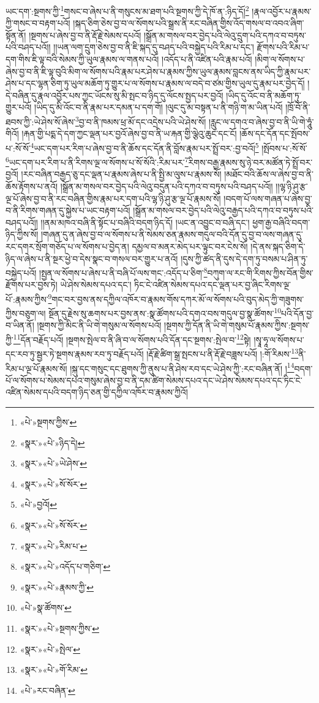 ཡང་དག་:སྔགས་ཀྱི་\footnote{«པེ་»སྔགས་ཀྱིས་}གསང་བ་ཞེས་པ་ནི་གསུངས་མ་ཐག་པའི་སྔགས་ཀྱི་དེ་ཁོ་ན་:ཉིད་དོ།\footnote{«སྣར་»«པེ་»ཉིད་དེ།} །རྣལ་འབྱོར་པ་རྣམས་ཀྱི་གསང་བ་བརྟག་པའོ། །སྐད་ཅིག་ཅེས་བྱ་བ་ལ་སོགས་པའི་སྒྲས་ནི་རང་བཞིན་གྱིས་འོད་གསལ་བ་འབའ་ཞིག་སྟོན་ནོ། །སྔགས་པ་ཞེས་བྱ་བ་ནི་རྡོ་རྗེ་སེམས་དཔའོ། །སྒྲོན་མ་གསལ་བར་བྱེད་པའི་ལེའུ་དྲུག་པའི་དཀའ་བ་བཏུས་པའི་བཤད་པའོ།། །།ཡན་ལག་དྲུག་ཅེས་བྱ་བ་ནི་ཇི་སྐད་དུ་བཤད་པའི་བསྐྱེད་པའི་རིམ་པ་དང་། རྫོགས་པའི་རིམ་པ་དག་གིས་ཇི་ལྟ་བའི་སེམས་ཀྱི་ཡུལ་རྣམས་ལ་གནས་པའོ། །འདོད་པ་ནི་འཛིན་པའི་རྣམ་པའོ། །མིག་ལ་སོགས་པ་ཞེས་བྱ་བ་ནི་ཇི་ལྟ་བུའི་མིག་ལ་སོགས་པའི་རྣམ་པར་ཤེས་པ་རྣམས་ཀྱིས་ཡུལ་རྣམས་བླངས་ནས་ཡིད་ཀྱི་རྣམ་པར་ཤེས་པ་དང་ལྷན་ཅིག་ཏུ་ཡུལ་མཆོག་ཏུ་གྱུར་པ་ལ་སོགས་པ་རྣམས་ལ་བདེ་བ་ཙམ་གྱིས་ཡུལ་དུ་རྣམ་པར་བྱེད་དོ། །དེ་བཞིན་དུ་རྣལ་འབྱོར་པས་ཀྱང་ཡོངས་སུ་མི་སྤང་བ་ཉིད་དུ་ལོངས་སྤྱད་པར་བྱའོ། །ཡིད་དུ་འོང་བ་ནི་མཆོག་ཏུ་གྱུར་པའོ། །ཡིད་དུ་མི་འོང་བ་ནི་རྣམ་པར་དམན་པ་དག་གོ། །ལུང་དུ་མ་བསྟན་པ་ནི་གཉི་ག་མ་ཡིན་པའོ། །ཁྲོ་བོ་ནི་ཐབས་ཀྱི་:ཡེ་ཤེས་སོ་ཞེས་\footnote{«སྣར་»«པེ་»ཡེ་ཤེས་}བྱ་བ་ནི་ཁམས་ཕྲ་མོ་དང་འདྲེས་པའི་ཡེ་ཤེས་སོ། །རླུང་ལ་དགའ་བ་ཞེས་བྱ་བ་ནི་ཡི་གེ་ཧཱུཾ་གིའོ། །རྐན་གྱི་པདྨ་དེ་དག་ཀྱང་ལྡན་པར་བྱའོ་ཞེས་བྱ་བ་ནི་ཡ་རྐན་གྱི་ལྕེའུ་ཆུང་དང་ངོ། །ཆོས་དང་དོན་དང་སྤོབས་པ་:སོ་སོ་\footnote{«སྣར་»«པེ་»སོ་སོར་}ཡང་དག་པར་རིག་པ་ཞེས་བྱ་བ་ནི་ཆོས་དང་དོན་ནི་བློས་རྣམ་པར་སྤྲོ་བར་:བྱ་བའོ།\footnote{«པེ་»བྱའོ།} །སྤོབས་པ་:སོ་སོ་\footnote{«སྣར་»«པེ་»སོ་སོར་}ཡང་དག་པར་རིག་པ་ནི་རིགས་ལྔ་ལ་སོགས་པ་སོ་སོའི་:རིམ་པར་\footnote{«སྣར་»«པེ་»རིམ་པ་}རིགས་བརྒྱ་རྣམས་སུ་ཉེ་བར་མཚོན་ཏེ་སྤྲོ་བར་བྱའོ། །རང་བཞིན་བརྒྱད་ཅུ་དང་ལྡན་པ་རྣམས་ཞེས་པ་ནི་སྤྱི་མ་ལུས་པ་རྣམས་སོ། །མཐོང་བའི་ཆོས་ལ་ཞེས་བྱ་བ་ནི་ཆོས་རྟོགས་པ་ནའོ། །སྒྲོན་མ་གསལ་བར་བྱེད་པའི་ལེའུ་བདུན་པའི་དཀའ་བ་བཏུས་པའི་བཤད་པའོ།། །།ལྷ་ཉི་ཤུ་རྩ་ལྔ་པོ་ཞེས་བྱ་བ་ནི་རང་བཞིན་གྱིས་རྣམ་པར་དག་པའི་ལྷ་ཉི་ཤུ་རྩ་ལྔ་པོ་རྣམས་སོ། །བདག་པོ་ལས་གཞན་པ་ཞེས་བྱ་བ་ནི་རིགས་གཞན་དུ་སྐྱེས་པ་ཡང་བརྟག་པའོ། །སྒྲོན་མ་གསལ་བར་བྱེད་པའི་ལེའུ་བརྒྱད་པའི་དཀའ་བ་བཏུས་པའི་བཤད་པའོ།། །།ནམ་མཁའ་བཞི་ནི་སྟོང་པ་བཞིའི་བདག་ཉིད་དོ། །ཡང་ན་འབྱུང་བ་བཞི་དང་། ཕྱག་རྒྱ་བཞིའི་བདག་ཉིད་ཀྱིས་སོ། །གཞན་དུ་ན་ཞེས་བྱ་བ་ལ་སོགས་པ་ནི་སེམས་ཅན་རྣམས་གདུལ་བའི་དོན་དུ་བྱ་བ་ལས་གཞན་དུ་རང་དགར་སྲོག་གཅོད་པ་ལ་སོགས་པ་བྱེད་ན། དམྱལ་བ་མནར་མེད་པར་ལྟུང་བར་ངེས་སོ། །དེ་ནས་སྐད་ཅིག་དེ་ཉིད་ལ་ཞེས་པ་ནི་སྔར་ཕྱེ་བ་དེས་སྣང་བ་གསལ་བར་གྱུར་པ་ནའོ། །དུས་ཀྱི་ཚད་ནི་དུས་དེ་དག་ཏུ་བསམ་པ་ཤིན་ཏུ་བསྐྱེད་པའོ། །སྤྱན་ལ་སོགས་པ་ཞེས་པ་ནི་བཞི་པོ་ལས་གང་:འདོད་པ་ཅིག་\footnote{«སྣར་»«པེ་»འདོད་པ་གཅིག་}བཀུག་ལ་རང་གི་རིགས་ཀྱིས་བོན་གྱིས་རྫོགས་པར་བྱས་ཏེ། ཡེ་ཤེས་སེམས་དཔའ་དང་། ཏིང་ངེ་འཛིན་སེམས་དཔའ་དང་ལྡན་པར་བྱ་ཞིང་རིགས་ལྔ་པོ་:རྣམས་ཀྱིས་\footnote{«སྣར་»«པེ་»རྣམས་ཀྱི་}གང་བར་བྱས་ནས་དཀྱིལ་འཁོར་བ་རྣམས་གོས་དཀར་མོ་ལ་སོགས་པའི་བུད་མེད་ཀྱི་གཟུགས་ཀྱིས་བཅུག་ལ། སྔོན་དུ་རྗེས་སུ་ཆགས་པར་བྱས་ནས་:སྣ་ཚོགས་པའི་དགའ་བས་གདུལ་བྱ་སྣ་ཚོགས་\footnote{«པེ་»སྣ་ཚོགས་}པའི་དོན་བྱ་བ་ཡིན་ནོ། །སྔགས་ཀྱི་མིང་ནི་ཡི་གེ་གསུམ་ལ་སོགས་པའོ། །སྔགས་ཀྱི་དོན་ནི་ཡི་གེ་གསུམ་པོ་རྣམས་ཀྱིས་:སྔགས་ཀྱི་\footnote{«སྣར་»«པེ་»སྔགས་ཀྱིས་}དོན་བརྗོད་པའོ། །སྔགས་སྤེལ་བ་ནི་ཞི་བ་ལ་སོགས་པའི་དོན་དང་སྔགས་:སྤེལ་བ་\footnote{«སྣར་»«པེ་»སྤེལ་}སྟེ། །སྭཱ་ཧཱ་ལ་སོགས་པ་དང་རབ་ཏུ་སྦྱར་ཏེ་སྔགས་རྣམས་རབ་ཏུ་བརྗོད་པའོ། །རྡོ་རྗེ་ཚིག་སྒྲ་སྤངས་པ་ནི་རྡོ་རྗེ་བཟླས་པའོ། །:གོ་རིམས་\footnote{«སྣར་»«པེ་»གོ་རིམ་}ནི་རིམ་པ་ལྔ་པོ་རྣམས་སོ། །སྐུ་དང་གསུང་དང་ཐུགས་ཀྱི་ནུས་པ་ནི་ཤེས་རབ་དང་ཡེ་ཤེས་ཀྱི་:རང་བཞིན་ནོ། །\footnote{«པེ་»རང་བཞིན་}བདག་པོ་ལ་སོགས་པ་སེམས་དཔའ་གསུམ་ཞེས་བྱ་བ་ནི་དམ་ཚིག་སེམས་དཔའ་དང་ཡེ་ཤེས་སེམས་དཔའ་དང་ཏིང་ངེ་འཛིན་སེམས་དཔའི་བདག་ཉིད་ཅན་གྱི་དཀྱིལ་འཁོར་བ་རྣམས་ཀྱིའོ། 